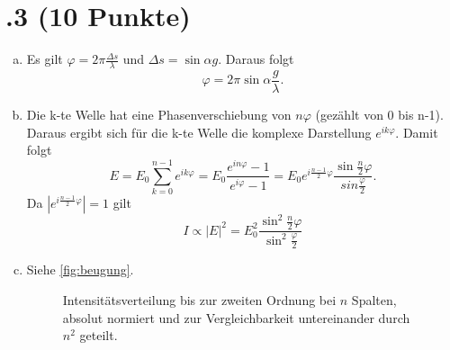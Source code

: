 \section*{\nr.3 \titthree (10 Punkte)}
\begin{enumerate}[(a)]
\item Es gilt $\varphi = 2\pi\frac{\Delta s}{\lambda}$ und $\Delta s = \sin{\alpha }g$. Daraus folgt
\begin{equation}
	\varphi = 2\pi\sin{\alpha}\frac{g}{\lambda}.
\end{equation}
\item Die k-te Welle hat eine Phasenverschiebung von $n\varphi$ (gezählt von 0 bis n-1). Daraus ergibt sich für die k-te Welle die komplexe Darstellung $e^{ik\varphi}$. Damit folgt
\begin{equation}
	E = E_0 \sum_{k=0}^{n-1} e^{ik\varphi} = E_0 \frac{e^{in\varphi} - 1}{e^{i\varphi}  - 1} = E_0 e^{i\frac{n-1}{2}\varphi}\frac{\sin{\frac{n}{2}\varphi}}{sin{\frac{\varphi}{2}}}.
\end{equation}
Da $|e^{i\frac{n-1}{2}\varphi}| = 1$ gilt
\begin{equation}
	I \propto |E|^2 = E_0^2 \frac{\sin^2{\frac{n}{2}\varphi}}{\sin^2{\frac{\varphi}{2}}}
\end{equation}
\item Siehe \vref{fig:beugung}.
\begin{figure}[htbp]
\centering

\caption{Intensitätsverteilung bis zur zweiten Ordnung bei $n$ Spalten, absolut normiert und zur Vergleichbarkeit untereinander durch $n^2$ geteilt.}
\label{fig:beugung}
\end{figure}
\end{enumerate}

